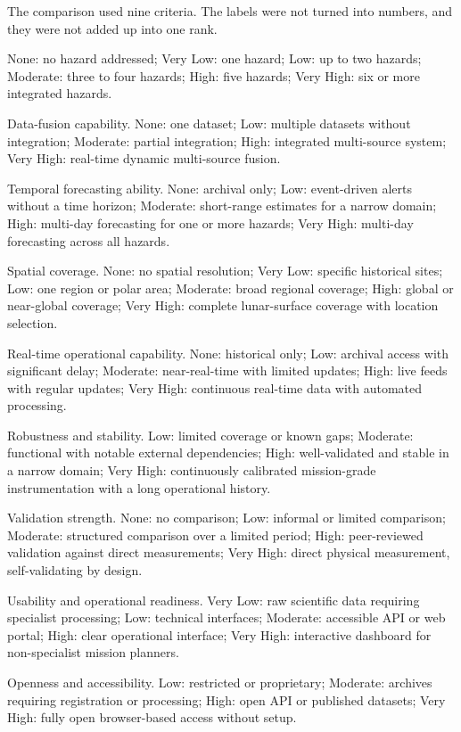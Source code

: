 The comparison used nine criteria. The labels were not turned into numbers, and they were not added up into one rank.

None: no hazard addressed; Very Low: one hazard; Low: up to two hazards; Moderate: three to four hazards; High: five hazards; Very High: six or more integrated hazards.

Data-fusion capability. None: one dataset; Low: multiple datasets without integration; Moderate: partial integration; High: integrated multi-source system; Very High: real-time dynamic multi-source fusion.

Temporal forecasting ability. None: archival only; Low: event-driven alerts without a time horizon; Moderate: short-range estimates for a narrow domain; High: multi-day forecasting for one or more hazards; Very High: multi-day forecasting across all hazards.

Spatial coverage. None: no spatial resolution; Very Low: specific historical sites; Low: one region or polar area; Moderate: broad regional coverage; High: global or near-global coverage; Very High: complete lunar-surface coverage with location selection.

Real-time operational capability. None: historical only; Low: archival access with significant delay; Moderate: near-real-time with limited updates; High: live feeds with regular updates; Very High: continuous real-time data with automated processing.

Robustness and stability. Low: limited coverage or known gaps; Moderate: functional with notable external dependencies; High: well-validated and stable in a narrow domain; Very High: continuously calibrated mission-grade instrumentation with a long operational history.

Validation strength. None: no comparison; Low: informal or limited comparison; Moderate: structured comparison over a limited period; High: peer-reviewed validation against direct measurements; Very High: direct physical measurement, self-validating by design.

Usability and operational readiness. Very Low: raw scientific data requiring specialist processing; Low: technical interfaces; Moderate: accessible API or web portal; High: clear operational interface; Very High: interactive dashboard for non-specialist mission planners.

Openness and accessibility. Low: restricted or proprietary; Moderate: archives requiring registration or processing; High: open API or published datasets; Very High: fully open browser-based access without setup.

